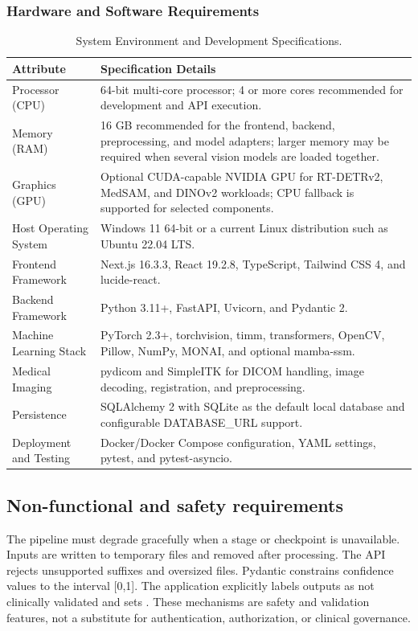 \documentclass[12pt,a4paper]{article}
\newcommand{\code}[1]{\texttt{\footnotesize\detokenize{#1}}}
\begin{document}
\subsubsection{Hardware and Software Requirements}
\begin{table}[H]
\centering
\small
\caption{System Environment and Development Specifications.}
\label{tab:system-requirements}
\begin{tabularx}{\textwidth}{|p{}|X|}
\hline
\textbf{Attribute} & \textbf{Specification Details}\\\hline
Processor (CPU) & 64-bit multi-core processor; 4 or more cores recommended for development and API execution.\\\hline
Memory (RAM) & 16 GB recommended for the frontend, backend, preprocessing, and model adapters; larger memory may be required when several vision models are loaded together.\\\hline
Graphics (GPU) & Optional CUDA-capable NVIDIA GPU for RT-DETRv2, MedSAM, and DINOv2 workloads; CPU fallback is supported for selected components.\\\hline
Host Operating System & Windows 11 64-bit or a current Linux distribution such as Ubuntu 22.04 LTS.\\\hline
Frontend Framework & Next.js 16.3.3, React 19.2.8, TypeScript, Tailwind CSS 4, and lucide-react.\\\hline
Backend Framework & Python 3.11+, FastAPI, Uvicorn, and Pydantic 2.\\\hline
Machine Learning Stack & PyTorch 2.3+, torchvision, timm, transformers, OpenCV, Pillow, NumPy, MONAI, and optional mamba-ssm.\\\hline
Medical Imaging & pydicom and SimpleITK for DICOM handling, image decoding, registration, and preprocessing.\\\hline
Persistence & SQLAlchemy 2 with SQLite as the default local database and configurable DATABASE\_URL support.\\\hline
Deployment and Testing & Docker/Docker Compose configuration, YAML settings, pytest, and pytest-asyncio.\\\hline
\end{tabularx}
\end{table}
\endgroup

\subsection{Non-functional and safety requirements}
The pipeline must degrade gracefully when a stage or checkpoint is unavailable. Inputs are written to temporary files and removed after processing. The API rejects unsupported suffixes and oversized files. Pydantic constrains confidence values to the interval [0,1]. The application explicitly labels outputs as not clinically validated and sets \code{recovery\_training\_enabled=false}. These mechanisms are safety and validation features, not a substitute for authentication, authorization, or clinical governance.
\end{document}
